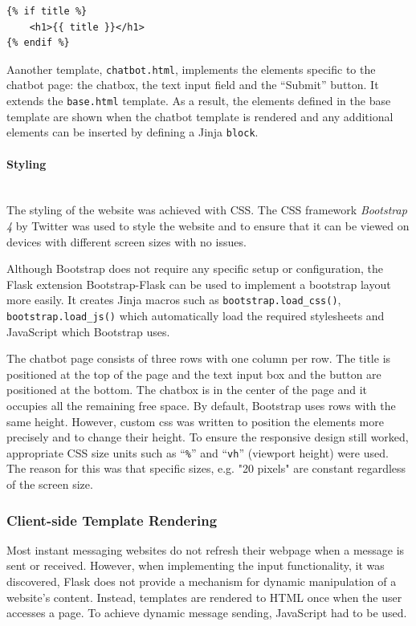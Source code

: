 \documentclass[12pt,a4paper]{article}
\newcommand{\myparagraph}[1]{\paragraph{#1}\mbox{}\\}
\newcommand{\captionstyle}[1] {
    \small{#1}
}
\begin{document}
\begin{lstlisting}[caption={\captionstyle{Using a variable passed from Python in a Jinja template.}}, label={lst:jinjavar}]
{% if title %}
    <h1>{{ title }}</h1>
{% endif %}
\end{lstlisting}

Aanother template, \texttt{chatbot.html}, implements the elements specific to the chatbot page: the chatbox, the text input field and the \enquote{Submit} button. It extends the \texttt{base.html} template. As a result, the elements defined in the base template are shown when the chatbot template is rendered and any additional elements can be inserted by defining a Jinja \texttt{block}.

\myparagraph{Styling}
The styling of the website was achieved with CSS. The CSS framework \textit{Bootstrap 4} by Twitter was used to style the website and to ensure that it can be viewed on devices with different screen sizes with no issues.

Although Bootstrap does not require any specific setup or configuration, the Flask extension Bootstrap-Flask can be used to implement a bootstrap layout more easily. It creates Jinja macros such as \texttt{bootstrap.load\_css()}, \texttt{bootstrap.load\_js()} which automatically load the required stylesheets and JavaScript which Bootstrap uses.

The chatbot page consists of three rows with one column per row. The title is positioned at the top of the page and the text input box and the button are positioned at the bottom. The chatbox is in the center of the page and it occupies all the remaining free space. By default, Bootstrap uses rows with the same height. However, custom css was written to position the elements more precisely and to change their height. To ensure the responsive design still worked, appropriate CSS size units such as \enquote{\texttt{\%}} and \enquote{\texttt{vh}} (viewport height) were used. The reason for this was that specific sizes, e.g. "20 pixels" are constant regardless of the screen size.

\subsubsection{Client-side Template Rendering}
Most instant messaging websites do not refresh their webpage when a message is sent or received. However, when implementing the input functionality, it was discovered, Flask does not provide a mechanism for dynamic manipulation of a website's content. Instead, templates are rendered to HTML once when the user accesses a page. To achieve dynamic message sending, JavaScript had to be used.
\end{document}
